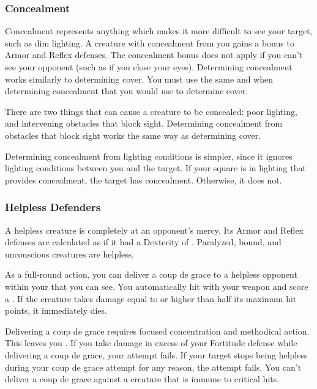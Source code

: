         \subsubsection{Concealment}\label{Concealment}
            Concealment represents anything which makes it more difficult to see your target, such as dim lighting.
            A creature with concealment from you gains a  bonus to Armor and Reflex defenses.
            The concealment bonus does not apply if you can't see your opponent (such as if you close your eyes).
            Determining concealment works similarly to determining cover.
            You must use the same  and  when determining concealment that you would use to determine cover.

             There are two things that can cause a creature to be concealed: poor lighting, and intervening obstacles that block sight.
            Determining concealment from obstacles that block sight works the same way as determining cover.

            Determining concealment from lighting conditions is simpler, since it ignores lighting conditions between you and the target.
            If your  square is in lighting that provides concealment, the target has concealment.
            Otherwise, it does not.

        \subsubsection{Helpless Defenders}
            A helpless creature is completely at an opponent's mercy.
            Its Armor and Reflex defenses are calculated as if it had a Dexterity of .
            Paralyzed, bound, and unconscious creatures are helpless.

            \label{Coup de Grace} As a full-round action, you can deliver a coup de grace to a helpless opponent within your  that you can see.
            You automatically hit with your weapon and score a . If the creature takes damage equal to or higher than half its maximum hit points, it immediately dies.

            Delivering a coup de grace requires focused concentration and methodical action. This leaves you . If you take damage in excess of your Fortitude defense while delivering a coup de grace, your attempt fails.
            If your target stops being helpless during your coup de grace attempt for any reason, the attempt fails.
            You can't deliver a coup de grace against a creature that is immune to critical hits.

